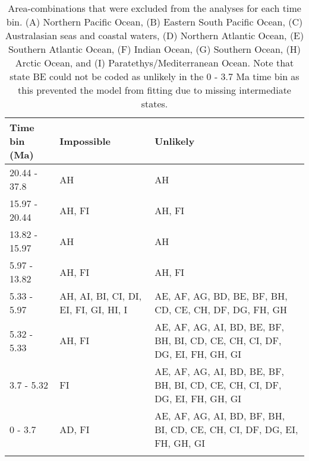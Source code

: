 \begin{longtable}{lll}

\caption{Area-combinations that were excluded from the analyses for each time bin. (A) Northern Pacific Ocean, (B) Eastern South Pacific Ocean, (C) Australasian seas and coastal waters, (D) Northern Atlantic Ocean, (E) Southern Atlantic Ocean, (F) Indian Ocean, (G) Southern Ocean, (H) Arctic Ocean, and (I) Paratethys/Mediterranean Ocean. Note that state BE could not be coded as unlikely in the 0 - 3.7 Ma time bin as this prevented the model from fitting due to missing intermediate states.}\\

\hline
\textbf{Time bin (Ma)} & \textbf{Impossible} & \textbf{Unlikely}\\
\hline
20.44 - 37.8 &
AH &
AH \\
15.97 - 20.44  &
AH, FI &
AH, FI\\
13.82 - 15.97 & 
AH &
AH\\
5.97 - 13.82 &
AH, FI &
AH, FI\\
5.33 - 5.97  &
AH, AI, BI, CI, DI, EI, FI, GI, HI, I &
AE, AF, AG, BD, BE, BF, BH, CD, CE, CH, DF, DG, FH, GH\\
5.32 - 5.33 &
AH, FI &
AE, AF, AG, AI, BD, BE, BF, BH, BI, CD, CE, CH, CI, DF, DG, EI, FH, GH, GI\\ 
3.7 - 5.32 &
FI &
AE, AF, AG, AI, BD, BE, BF, BH, BI, CD, CE, CH, CI, DF, DG, EI, FH, GH, GI\\ 
0 - 3.7  &
AD, FI &
AE, AF, AG, AI, BD, BF, BH, BI, CD, CE, CH, CI, DF, DG, EI, FH, GH, GI\\
\hline

\label{table-states}
\end{longtable}
